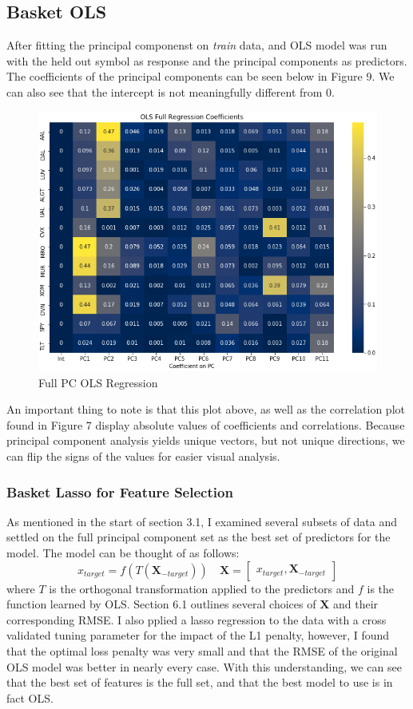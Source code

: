 \documentclass{article}
\begin{document}
\subsection{Basket OLS}
After fitting the principal componenst on \textit{train} data, and OLS model
was run with the held out symbol as response and the principal components as 
predictors. The coefficients of the principal components can be seen below in
Figure 9. We can also see that the intercept is not meaningfully different from 0.
\begin{figure}[h!]
  \centering
  \includegraphics[width=.6\linewidth]{../Figures/Full_PCReg_coef.png}
  \caption{Full PC OLS Regression}
\end{figure}
An important thing to note is that this plot above, as well as the correlation plot
found in Figure 7 display absolute values of coefficients and correlations. Because
principal component analysis yields unique vectors, but not unique directions,
we can flip the signs of the values for easier visual analysis.
\subsubsection{Basket Lasso for Feature Selection}
As mentioned in the start of section 3.1, I examined several subsets of data and 
settled on the full principal component set as the best set of predictors for the model.
The model can be thought of as follows:
$$x_{target} = f(T(\mathbf{X}_{-target}))
\quad
\mathbf{X} = \begin{bmatrix}x_{target}, \mathbf{X}_{-target}\end{bmatrix}
$$
where $T$ is the orthogonal transformation applied to the predictors and
$f$ is the function learned by OLS. Section 6.1
outlines several choices of $\mathbf{X}$ and their corresponding RMSE. I also pplied
a lasso regression to the data with a cross validated tuning parameter for 
the impact of the L1 penalty, however, I found that the optimal loss penalty 
was very small and that the RMSE of the original OLS model was better in 
nearly every case. With this understanding, we can see that the best set
of features is the full set, and that the best model to use is in fact OLS.
\end{document}
